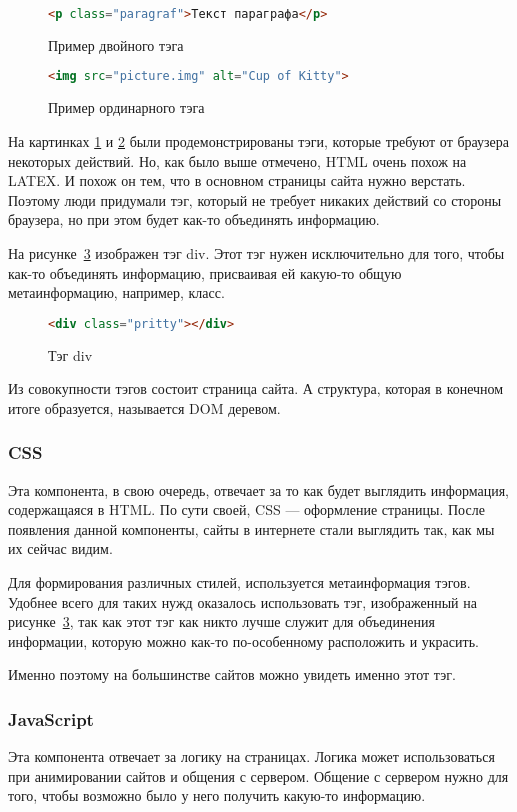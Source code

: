 \begin{figure}
    \begin{lstlisting}[language=html]
        <p class="paragraf">Текст параграфа</p>
    \end{lstlisting}
    \caption{Пример двойного тэга}
    \label{html-tag-2}
\end{figure}
\begin{figure}
    \begin{lstlisting}[language=html]
        <img src="picture.img" alt="Cup of Kitty">
    \end{lstlisting}
    \caption{Пример ординарного тэга}
    \label{html-tag-1}
\end{figure}

На картинках \ref{html-tag-2} и \ref{html-tag-1} были продемонстрированы тэги, которые требуют от браузера некоторых действий.
Но, как было выше отмечено, HTML очень похож на LATEX. И похож он тем, что в основном страницы сайта нужно верстать. 
Поэтому люди придумали тэг, который не требует никаких действий со стороны браузера, но при этом будет как-то объединять информацию.

На рисунке~\ref{html-div} изображен тэг div. Этот тэг нужен исключительно для того, чтобы как-то объединять информацию, присваивая ей какую-то общую метаинформацию, например, класс.

\begin{figure}
	\begin{lstlisting}[language=html]
	<div class="pritty"></div>
	\end{lstlisting}
	\caption{Тэг div}
	\label{html-div}
\end{figure}

Из совокупности тэгов состоит страница сайта. А структура, которая в конечном итоге образуется, называется DOM деревом.

\subsubsection{CSS}
Эта компонента, в свою очередь, отвечает за то как будет выглядить информация, содержащаяся в HTML. По сути своей, CSS --- оформление страницы.
После появления данной компоненты, сайты в интернете стали выглядить так, как мы их сейчас видим.

Для формирования различных стилей, используется метаинформация тэгов. 
Удобнее всего для таких нужд оказалось использовать тэг, изображенный на рисунке~\ref{html-div}, так как этот тэг как никто лучше служит для объединения информации, которую можно как-то по-особенному
расположить и украсить.

Именно поэтому на большинстве сайтов можно увидеть именно этот тэг.

\subsubsection{JavaScript}
Эта компонента отвечает за логику на страницах. Логика может использоваться при анимировании сайтов и общения с сервером. Общение с сервером нужно для того, чтобы возможно было у него получить какую-то информацию.


 

